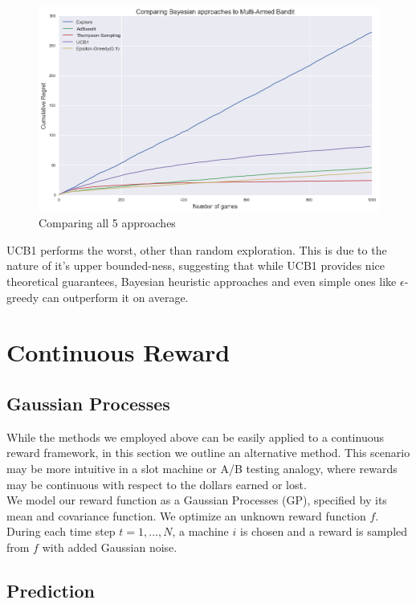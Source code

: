 \documentclass{article}
\begin{document}
\begin{figure}[H]
\centering
\includegraphics[scale=0.4]{all.png}
\caption{Comparing all 5 approaches}
\end{figure}

UCB1 performs the worst, other than random exploration. This is due to the nature of it's upper bounded-ness, suggesting that while UCB1 provides nice theoretical guarantees, Bayesian heuristic approaches and even simple ones like $\epsilon$-greedy can outperform it on average.

\section{Continuous Reward}

\subsection{Gaussian Processes}

While the methods we employed above can be easily applied to a continuous reward framework, in this section we outline an alternative method. This scenario may be more intuitive in a slot machine or A/B testing analogy, where rewards may be continuous with respect to the dollars earned or lost.\\

We model our reward function as a Gaussian Processes (GP), specified by its mean and covariance function. We optimize an unknown reward function $f$. During each time step $t = 1,...,N$, a machine $i$ is chosen and a reward is sampled from $f$ with added Gaussian noise.\\

\subsection{Prediction}
\end{document}
